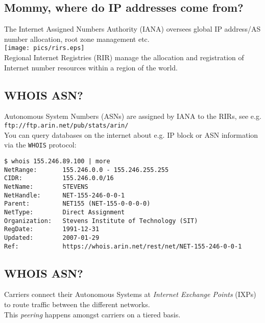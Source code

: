 \documentclass[xga]{xdvislides}
\begin{document}
\subsection{Mommy, where do IP addresses come from?}
\vspace*{\fill}
\begin{center}
The Internet Assigned Numbers Authority (IANA) oversees global IP
address/AS number allocation, root zone management etc. \\
	\vspace{.5in}
	\texttt{[image: pics/rirs.eps]} \\
	\vspace{.5in}
	Regional Internet Registries (RIR) manage the allocation and
registration of Internet number resources within a region of the world.
\end{center}
\vspace*{\fill}

\subsection{WHOIS ASN?}
Autonomous System Numbers (ASNs) are assigned by IANA
to the RIRs, see e.g. {\tt
ftp://ftp.arin.net/pub/stats/arin/}
\\

You can query databases on the internet about e.g. IP
block or ASN information via the {\tt WHOIS} protocol:

\begin{verbatim}
$ whois 155.246.89.100 | more
NetRange:       155.246.0.0 - 155.246.255.255
CIDR:           155.246.0.0/16
NetName:        STEVENS
NetHandle:      NET-155-246-0-0-1
Parent:         NET155 (NET-155-0-0-0-0)
NetType:        Direct Assignment
Organization:   Stevens Institute of Technology (SIT)
RegDate:        1991-12-31
Updated:        2007-01-29
Ref:            https://whois.arin.net/rest/net/NET-155-246-0-0-1
\end{verbatim}

\subsection{WHOIS ASN?}
Carriers connect their Autonomous Systems at {\em
Internet Exchange Points} (IXPs) to route traffic
between the different networks.\\

This {\em peering} happens amongst carriers on a
tiered basis. \\
\end{document}
